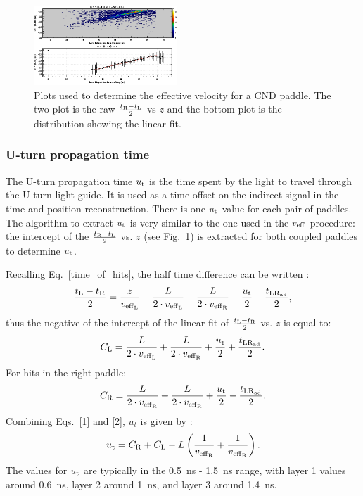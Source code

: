 \begin{figure}[htb]
\begin{center}
\includegraphics[width=0.48\textwidth]{Figure/veff.png} 
\end{center}
\caption{Plots used to determine the effective velocity for a CND paddle. The two plot is the raw $\frac{t_{\rm{R}}-t_{\rm{L}}}{2}$ vs $z$ and the bottom plot is the distribution showing the linear fit.}
\label{effv}
\end{figure}

\subsubsection{U-turn propagation time}

The U-turn propagation time $u_{\rm{t}}$ is the time spent by the light to travel through the U-turn light guide. It is used as a time offset on the indirect signal in the time and position reconstruction. There is one $u_{\rm{t}}$ value for each pair of paddles.
The algorithm to extract $u_{\rm{t}}$ is very similar to the one used in the $v_{\rm{eff}}$ procedure: the intercept of the $\frac{t_{\rm{R}}-t_{\rm{L}}}{2}$ vs. $z$ (see Fig.~\ref{effv}) is extracted for both coupled paddles to determine $u_{\rm{t}}$.

Recalling Eq.~\ref{time_of_hits}, the half time difference can be written :
\begin{equation}
\frac{t_{\rm{L}}-t_{\rm{R}}}{2}=\frac{z}{v_{\rm{eff}_L}}-\frac{L}{2\cdot v_{\rm{eff}_{\rm{L}}}}-\frac{L}{2\cdot v_{\rm{eff}_{\rm{R}}}}-\frac{u_{\rm{t}}}{2}-\frac{t_{\rm{LR}_{\rm{ad}}}}{2},
\end{equation}
thus the negative of the intercept of the linear fit of $\frac{t_{\rm{L}}-t_{\rm{R}}}{2}$ vs. $z$ is equal to:
\begin{equation}
\label{1}
C_{\rm{L}}=\frac{L}{2\cdot v_{\rm{eff}_{\rm{L}}}}+\frac{L}{2\cdot v_{\rm{eff}_{\rm{R}}}}+\frac{u_{\rm{t}}}{2}+\frac{t_{\rm{LR}_{\rm{ad}}}}{2}.
\end{equation}
For hits in the right paddle:
\begin{equation}
\label{2}
C_{\rm{R}}=\frac{L}{2\cdot v_{\rm{eff}_{\rm{R}}}}+\frac{L}{2\cdot v_{\rm{eff}_{\rm{R}}}}+\frac{u_{\rm{t}}}{2}-\frac{t_{\rm{LR}_{\rm{ad}}}}{2}.
\end{equation}
Combining Eqs.~\ref{1} and \ref{2}, $u_t$ is given by :
\begin{equation}
u_{\rm{t}}=C_{\rm{R}}+C_{\rm{L}}-L \left(\frac{1}{v_{\rm{eff}_{\rm{R}}}}+\frac{1}{v{_{\rm{eff}_{\rm{R}}}}}\right).
\end{equation}
The values for $u_{\rm{t}}$ are typically in the 0.5~ns - 1.5~ns range, with layer 1 values around 0.6~ns, layer 2 around 1~ns, and layer 3 around 1.4~ns.


